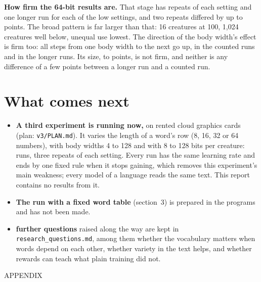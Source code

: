 \documentclass[10pt,letterpaper]{article}
\newcommand{\smallcaps}[1]{{\sffamily\fontsize{7.6}{9}\selectfont\color{second}\addfontfeature{LetterSpace=7}#1}}
\newcommand{\s}[1]{\texttt{#1}}                  %
\newcommand{\lead}[1]{\textbf{#1}}               %
\begin{document}
\lead{How firm the 64-bit results are.} That stage has \RepeatsSixtyFourWord{} repeats of each
setting and one longer run for each of the \SettingsBelowWord{} low settings, and two repeats differed
by up to \RepeatSpreadHigh{} points. The broad pattern is far larger than that: 16 creatures at 100,
1,024 creatures well below, unequal use lowest. The direction of the body width's effect is firm
too: all \BodyStepsAll{} steps from one body width to the next go up, \BodyStepsCounted{} in the
counted runs and \BodyStepsLonger{} in the longer runs. Its size, \BodyRiseLowWhole{} to
\BodyRiseHighWhole{} points, is not firm, and neither is any difference of a few points between a
longer run and a counted run.

\section{What comes next}

\begin{itemize}
\item \lead{A third experiment is running now,} on rented cloud graphics cards (plan:
      \s{v3/PLAN.md}). It varies the length of a word's row (8, 16, 32 or 64 numbers), with body
      widths 4 to 128 and with 8 to 128 bits per creature: \ThirdRuns{} runs, three repeats of each
      setting. Every run has the same learning rate and ends by one fixed rule when it stops
      gaining, which removes this experiment's main weakness; every model of a language reads the
      same text. This report contains no results from it.
\item \lead{The run with a fixed word table} (section~3) is prepared in the programs and has not
      been made.
\item \lead{\FurtherQuestionsWordCap{} further questions} raised along the way are kept in
      \s{research\_questions.md}, among them whether the vocabulary matters when words depend on
      each other, whether variety in the text helps, and whether rewards can teach what plain
      training did not.
\end{itemize}

\appendix
\vspace{8pt}
\smallcaps{APPENDIX}\par\vspace{-9pt}
\end{document}
